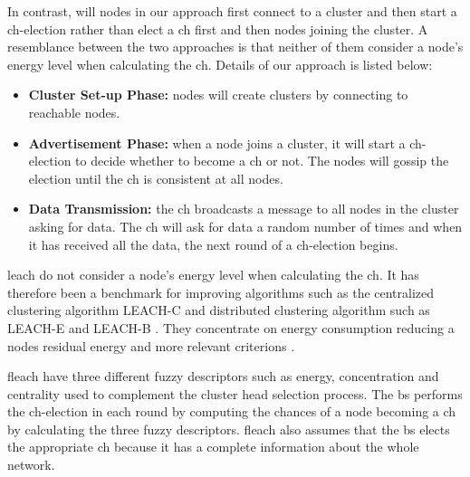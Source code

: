 \documentclass[USenglish]{uit-thesis}
\begin{document}
In contrast, will nodes in our approach first connect to a cluster and then start a \gls{ch}-election rather than elect a \gls{ch} first and then nodes joining the cluster. %
A resemblance between the two approaches is that neither of them consider a node's energy level when calculating the \gls{ch}. Details of our approach is listed below:

\begin{itemize}
\item \textbf{Cluster Set-up Phase:} nodes will create clusters by connecting to reachable nodes.
\item \textbf{Advertisement Phase:} when a node joins a cluster, it will start a \gls{ch}-election to decide whether to become a \gls{ch} or not. The nodes will gossip the election until the \gls{ch} is consistent at all nodes.
\item \textbf{Data Transmission:} the \gls{ch} broadcasts a message to all nodes in the cluster asking for data. The \gls{ch} will ask for data a random number of times and when it has received all the data, the next round of a \gls{ch}-election begins.
\end{itemize}




\gls{leach} do not consider a node's energy level when calculating the \gls{ch}. It has therefore been a benchmark for improving algorithms such as the centralized clustering algorithm LEACH-C \cite {leach_c} and distributed clustering algorithm such as LEACH-E \cite{leach_e} and LEACH-B \cite{leach_b}. They concentrate on energy consumption reducing a nodes residual energy and more relevant criterions \cite{dec_cb_alg}.



\Gls{fleach} \cite{fuzzy_logic, ch_fuzzy} have three different fuzzy descriptors such as energy, concentration and centrality used to complement the cluster head selection process. The \gls{bs} performs the \gls{ch}-election in each round by computing the chances of a node becoming a \gls{ch} by calculating the three fuzzy descriptors. \Gls{fleach} also assumes that the \gls{bs} elects the appropriate \gls{ch} because it has a complete information about the whole network.
\end{document}
